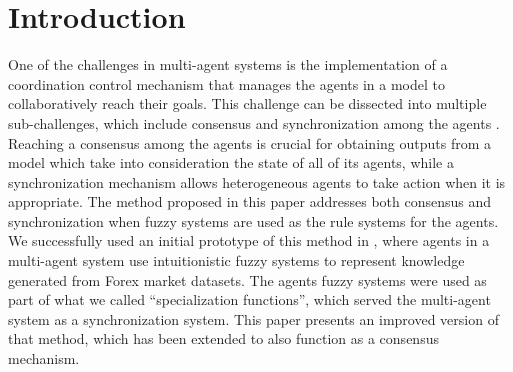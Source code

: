 \section{Introduction}
\label{section:introduction}

One of the challenges in multi-agent systems is the implementation of
a coordination control mechanism that manages the agents in a model to
collaboratively reach their goals. This challenge can be dissected
into multiple sub-challenges, which include consensus and
synchronization among the agents \cite{dorri2018multi}. Reaching a
consensus among the agents is crucial for obtaining outputs from a
model which take into consideration the state of all of its agents,
while a synchronization mechanism allows heterogeneous agents to take
action when it is appropriate. The method proposed in this paper
addresses both consensus and synchronization when fuzzy systems are
used as the rule systems for the agents. We successfully used an
initial prototype of this method in \cite{hernandez2021using}, where
agents in a multi-agent system use intuitionistic fuzzy systems to
represent knowledge generated from Forex market datasets. The agents
fuzzy systems were used as part of what we called ``specialization
functions'', which served the multi-agent system as a synchronization
system. This paper presents an improved version of that method, which
has been extended to also function as a consensus mechanism.

